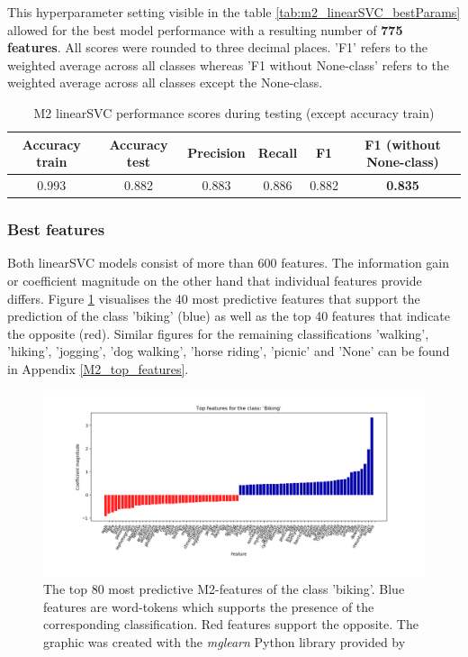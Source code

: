 This hyperparameter setting visible in the table \ref{tab:m2_linearSVC_bestParams} allowed for the best model performance with a resulting number of \textbf{775 features}. All scores were rounded to three decimal places. 'F1' refers to the weighted average across all classes whereas 'F1 without None-class' refers to the weighted average across all classes except the None-class.

\begin{table}[h!]
\begin{center}
\caption{M2 linearSVC performance scores during testing (except accuracy train)}\vspace{1ex}
\label{tab:m2_linearSVC_bestscores}
\begin{tabular}{cccccc}\hline
Accuracy train & Accuracy test & Precision & Recall & F1 & F1 (without None-class)\\ \hline
0.993 & 0.882 & 0.883 & 0.886 & 0.882 & \textbf{0.835} \\ \hline
\end{tabular}
\end{center}
\end{table}

\subsubsection{Best features}
Both linearSVC models consist of more than 600 features. The information gain or coefficient magnitude on the other hand that individual features provide differs. Figure \ref{fig:M2_top40_features_biking} visualises the 40 most predictive features that support the prediction of the class 'biking' (blue) as well as the top 40 features that indicate the opposite (red). Similar figures for the remaining classifications 'walking', 'hiking', 'jogging', 'dog walking', 'horse riding', 'picnic' and 'None' can be found in Appendix \ref{M2_top_features}. 
\begin{figure}[h!]
   \centering
   \includegraphics[width=\textwidth]{img/m2_top_40_features_Biking_cropped.pdf}
   \caption{The top 80 most predictive M2-features of the class 'biking'. Blue features are word-tokens which supports the presence of the corresponding classification. Red features support the opposite. The graphic was created with the \textit{mglearn} Python library provided by \textcite{Guido2016}}
   \label{fig:M2_top40_features_biking}
\end{figure}

